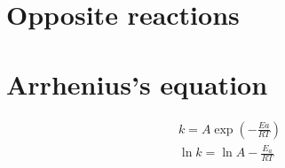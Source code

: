 \documentclass[../Master.tex]{subfiles}
\begin{document}
\begin{multicols}{2}
		 \section{Opposite reactions}

		 \section{Arrhenius's equation}
		  \begin{gather*}
				   k = A \exp \left( -\frac{Ea}{RT} \right)\\
				   \ln k = \ln A - \frac{E_{a}}{RT}
		  \end{gather*}
\end{multicols}
\end{document}
